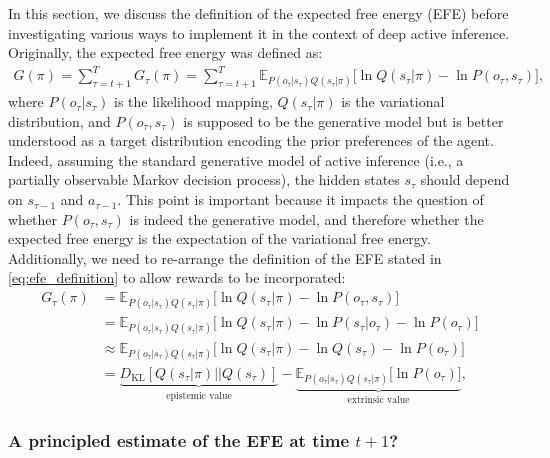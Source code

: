 \documentclass[twoside,11pt]{article}
\newcommand{\kl}[2]{D_{\mathrm{KL}} \left[ \left. \left. #1 \right|\right| #2 \right] }
\begin{document}
In this section, we discuss the definition of the expected free energy (EFE) before investigating various ways to implement it in the context of deep active inference. Originally, the expected free energy was defined as:
\begin{align}
G(\pi) = \sum_{\tau = t+1}^T G_\tau(\pi) = \sum_{\tau = t+1}^T \mathbb{E}_{P(o_\tau|s_\tau)Q(s_\tau | \pi)}\big[\ln Q(s_\tau | \pi) - \ln P(o_\tau, s_\tau)\big],\label{eq:efe_definition}
\end{align}
where $P(o_\tau|s_\tau)$ is the likelihood mapping, $Q(s_\tau | \pi)$ is the variational distribution, and $P(o_\tau, s_\tau)$ is supposed to be the generative model but is better understood as a target distribution encoding the prior preferences of the agent. Indeed, assuming the standard generative model of active inference (i.e., a partially observable Markov decision process), the hidden states $s_\tau$ should depend on $s_{\tau-1}$ and $a_{\tau-1}$. This point is important because it impacts the question of whether $P(o_\tau, s_\tau)$ is indeed the generative model, and therefore whether the expected free energy is the expectation of the variational free energy. Additionally, we need to re-arrange the definition of the EFE stated in \eqref{eq:efe_definition} to allow rewards to be incorporated:
\begin{align}
G_\tau(\pi) &= \mathbb{E}_{P(o_\tau|s_\tau)Q(s_\tau | \pi)}\big[\ln Q(s_\tau | \pi) - \ln P(o_\tau, s_\tau)\big]\nonumber\\
&= \mathbb{E}_{P(o_\tau|s_\tau)Q(s_\tau | \pi)}\big[\ln Q(s_\tau | \pi) - \ln P(s_\tau|o_\tau)- \ln P(o_\tau)\big]\nonumber\\
&\approx \mathbb{E}_{P(o_\tau|s_\tau)Q(s_\tau | \pi)}\big[\ln Q(s_\tau | \pi) - \ln Q(s_\tau)- \ln P(o_\tau)\big]\nonumber\\
&= \underbrace{\kl{Q(s_\tau | \pi)}{Q(s_\tau)}}_{\text{epistemic value}} - \underbrace{\mathbb{E}_{P(o_\tau|s_\tau)Q(s_\tau | \pi)}\big[\ln P(o_\tau)\big]}_{\text{extrinsic value}},\label{eq:efe_practice}
\end{align}

\subsubsection{A principled estimate of the EFE at time $t + 1$?}
\end{document}
